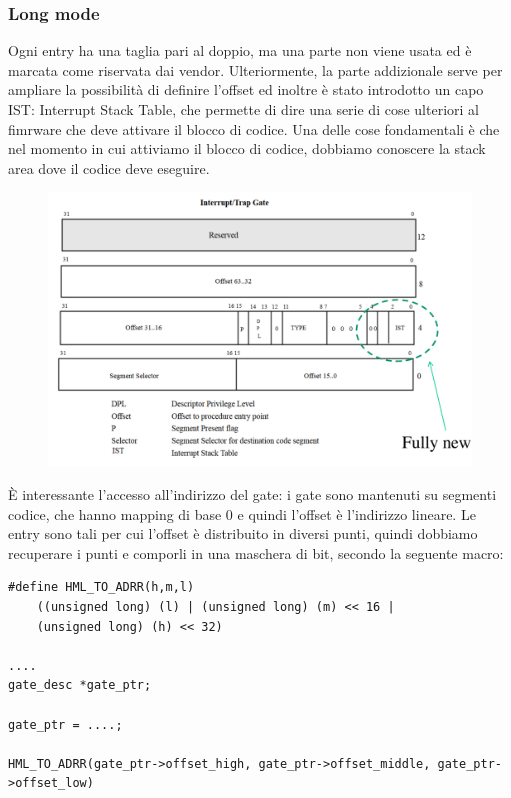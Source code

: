 \documentclass[12pt, oneside]{extbook}
\begin{document}
\subsubsection{Long mode}
Ogni entry ha una taglia pari al doppio, ma una parte non viene usata ed è marcata come riservata dai vendor. Ulteriormente, la parte addizionale serve per ampliare la possibilità di definire l'offset ed inoltre è stato introdotto un capo IST: Interrupt Stack Table, che permette di dire una serie di cose ulteriori al fimrware che deve attivare il blocco di codice. Una delle cose fondamentali è che nel momento in cui attiviamo il blocco di codice, dobbiamo conoscere la stack area dove il codice deve eseguire.
\begin{figure}[!h]
	\includegraphics[scale=0.2]{immagini/x86_long_idt_entry.png}
\end{figure}
È interessante l'accesso all'indirizzo del gate: i gate sono mantenuti su segmenti codice, che hanno mapping di base 0 e quindi l'offset è l'indirizzo lineare. Le entry sono tali per cui l'offset è distribuito in diversi punti, quindi dobbiamo recuperare i punti e comporli in una maschera di bit, secondo la seguente macro:
\begin{lstlisting}
#define HML_TO_ADRR(h,m,l)
	((unsigned long) (l) | (unsigned long) (m) << 16 | 
	(unsigned long) (h) << 32)

....
gate_desc *gate_ptr;

gate_ptr = ....;

HML_TO_ADRR(gate_ptr->offset_high, gate_ptr->offset_middle, gate_ptr->offset_low)
\end{lstlisting}
\end{document}

